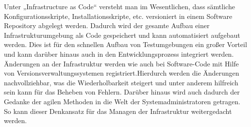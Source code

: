 Unter „Infrastructure as Code“ versteht man im Wesentlichen, dass sämtliche Konfigurationsskripte, Installationsskripte, etc. versioniert in einem Software Repository abgelegt werden. Dadurch wird der gesamte Aufbau einer Infrastrukturumgebung als Code gespeichert und kann automatisiert aufgebaut werden.  Dies ist für den schnellen Aufbau von Testumgebungen ein großer Vorteil und kann darüber hinaus auch in den Entwicklungsprozess integriert werden. Änderungen an der Infrastruktur werden wie auch bei Software-Code mit Hilfe von Versionsverwaltungssystemen registriert.Hierdurch werden die Änderungen nachvollziehbar, was die Wiederholbarkeit steigert und unter anderem hilfreich sein kann für das Beheben von Fehlern. Darüber hinaus wird auch dadurch der Gedanke der agilen Methoden in die Welt der Systemadministratoren getragen. So kann dieser Denkansatz für das Managen der Infrastruktur weitergedacht werden. 
